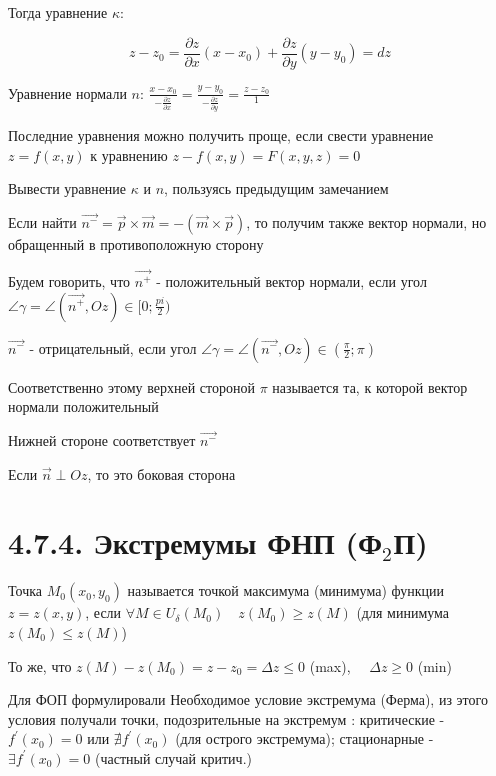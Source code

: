\documentclass[12pt]{article}
\begin{document}
    Тогда уравнение $\kappa$:

    \[z - z_0 = \frac{\partial z}{\partial x}(x - x_0) + \frac{\partial z}{\partial y} (y - y_0) = dz\]

    Уравнение нормали $n$: $\frac{x - x_0}{-\frac{\partial z}{\partial x}} = \frac{y - y_0}{-\frac{\partial z}{\partial y}} = \frac{z - z_0}{1}$

    \Nota Последние уравнения можно получить проще, если свести уравнение $z = f(x, y)$ к уравнению $z - f(x, y) = F(x, y, z) = 0$

    \Lab Вывести уравнение $\kappa$ и $n$, пользуясь предыдущим замечанием

    \Nota Если найти $\overrightarrow{n^-} = \overrightarrow{p} \times \overrightarrow{m} = - (\overrightarrow{m} \times \overrightarrow{p})$, то получим также вектор нормали, но обращенный в противоположную сторону

    Будем говорить, что $\overrightarrow{n^+}$ - положительный вектор нормали, если угол $\angle\gamma = \angle (\overrightarrow{n^+}, Oz) \in [0; \frac{pi}{2})$

    $\overrightarrow{n^-}$ - отрицательный, если угол $\angle\gamma = \angle (\overrightarrow{n^-}, Oz) \in \left(\frac{\pi}{2}; \pi\right)$

    Соответственно этому верхней стороной $\pi$ называется та, к которой вектор нормали положительный

    Нижней стороне соответствует $\overrightarrow{n^-}$

    Если $\overrightarrow{n} \perp Oz$, то это боковая сторона

    \section{4.7.4. Экстремумы ФНП (Ф$_2$П)}

    \hypertarget{extremumsoffunctions}{}

    \Def Точка $M_0(x_0, y_0)$ называется точкой максимума (минимума) функции $z = z(x, y)$, если $\forall M \in U_\delta (M_0) \quad z(M_0) \geq z(M)$ (для минимума $z(M_0) \leq z(M)$)

    \Nota То же, что $z(M) - z(M_0) = z - z_0 = \Delta z \leq 0$ (max), $\quad \Delta z \geq 0$ (min)

    \Mem Для ФОП формулировали Необходимое условие экстремума (Ферма), из этого условия получали точки, подозрительные на экстремум : критические - $f^\prime(x_0) = 0$ или $\nexists f^\prime(x_0)$ (для острого экстремума); стационарные - $\exists f^\prime(x_0) = 0$ (частный случай критич.)
\end{document}
